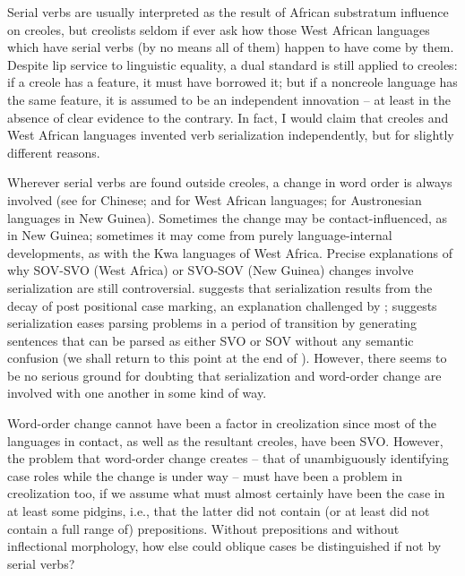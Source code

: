 Serial verbs are usually interpreted as the result of African substratum influence on creoles, but creolists seldom if ever ask how those West African languages which have serial verbs (by no means all of them) happen to have come by them. Despite lip service to linguistic equality, a dual standard is still applied to creoles: if a creole has a feature, it must have borrowed it; but if a noncreole language has the same feature, it is assumed to be an independent innovation -- at least in the absence of clear evidence to the contrary. In fact, I would claim that creoles and West African languages invented verb serialization independently, but for slightly different reasons.

Wherever serial verbs are found outside creoles, a change in word order is always involved (see \citet{LiEtAl1974} for Chinese; \citet{Givón1974} and \citet{Hyman1974} for West African languages; \citet{Bradshaw1979} for Austronesian languages in New Guinea). Sometimes the change may be contact-influenced, as in New Guinea; sometimes it may come from purely language-internal developments, as with the Kwa languages of West Africa. Precise explanations of why SOV-SVO (West Africa) or SVO-SOV (New Guinea) changes involve serialization are still controversial. \citet{Givón1974} suggests that serialization results from the decay of post positional case marking, an explanation chal\-lenged by \citet{Hyman1974}; \citet{Bradshaw1979} suggests serialization eases parsing problems in a period of transition by generating sentences that can be parsed as either SVO or SOV without any semantic confu\-sion (we shall return to this point at the end of ). However, there seems to be no serious ground for doubting that serialization and word-order change are involved with one another in some kind of way.

Word-order change cannot have been a factor in creolization since most of the languages in contact, as well as the resultant creoles, have been SVO. However, the problem that word-order change creates --
that of unambiguously identifying case roles while the change is under way -- must have been a problem in creolization too, if we assume what must almost certainly have been the case in at least some pidgins, i.e., that the latter did not contain (or at least did not contain a full range of) prepositions. Without prepositions and without inflectional morphology, how else could oblique cases be distinguished if not by serial verbs?

